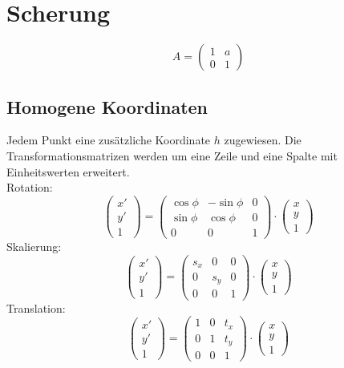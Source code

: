 \documentclass{report}
\begin{document}
\section{Scherung}
\begin{equation}A=\left(\begin{matrix}1 & a \\ 0 & 1\end{matrix}\right)\end{equation}
\subsection{Homogene Koordinaten}
Jedem Punkt eine zusätzliche Koordinate $h$ zugewiesen. Die Transformationsmatrizen werden um eine Zeile und eine Spalte mit Einheitswerten erweitert.\\Rotation:
\begin{equation}\left(\begin{matrix}x'\\y'\\1\end{matrix}\right) = \left(\begin{matrix}\cos{\phi} & -\sin{\phi} & 0\\ \sin{\phi} & \cos{\phi} & 0 \\ 0 & 0 &  1\end{matrix}\right) \cdot \left(\begin{matrix}x\\y\\1\end{matrix}\right) \end{equation}
Skalierung:
\begin{equation}\left(\begin{matrix}x'\\y'\\1\end{matrix}\right) = \left(\begin{matrix}s_x & 0 & 0 \\ 0 & s_y & 0 \\ 0 & 0 & 1\end{matrix}\right) \cdot \left(\begin{matrix}x\\y\\1\end{matrix}\right) \end{equation}
Translation:
\begin{equation}\left(\begin{matrix}x'\\y'\\1\end{matrix}\right) = \left(\begin{matrix}1 & 0 & t_x \\ 0 & 1 & t_y \\ 0 & 0 & 1\end{matrix}\right) \cdot \left(\begin{matrix}x\\y\\1\end{matrix}\right) \end{equation}
\end{document}
